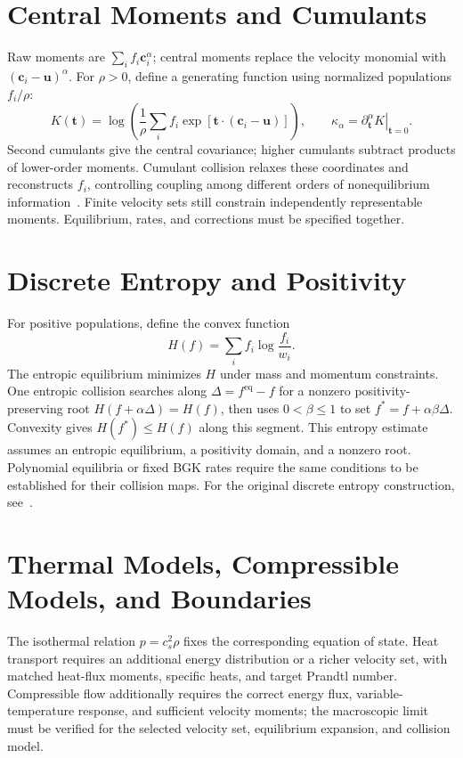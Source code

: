 \section{Central Moments and Cumulants}
Raw moments are $\sum_i f_i\bm c_i^\alpha$; central moments replace the velocity monomial with
$(\bm c_i-\bm u)^\alpha$.
For $\rho>0$, define a generating function using normalized populations $f_i/\rho$:
\[
K(\bm t)=\log\left(\frac1\rho\sum_i f_i
\exp[\bm t\cdot(\bm c_i-\bm u)]\right),\qquad
\kappa_\alpha=\left.\partial_{\bm t}^{\alpha}K\right|_{\bm t=0}.
\]
Second cumulants give the central covariance; higher cumulants subtract products of lower-order moments.
Cumulant collision relaxes these coordinates and reconstructs $f_i$,
controlling coupling among different orders of nonequilibrium information~\cite{geier2015}.
Finite velocity sets still constrain independently representable moments. Equilibrium, rates, and corrections must be specified together.

\section{Discrete Entropy and Positivity}
For positive populations, define the convex function
\[
H(f)=\sum_i f_i\log\frac{f_i}{w_i}.
\]
The entropic equilibrium minimizes $H$ under mass and momentum constraints.
One entropic collision searches along $\Delta=f^{\mathrm{eq}}-f$ for a nonzero positivity-preserving root
$H(f+\alpha\Delta)=H(f)$, then uses $0<\beta\le1$ to set
$f^*=f+\alpha\beta\Delta$.
Convexity gives $H(f^*)\le H(f)$ along this segment.
This entropy estimate assumes an entropic equilibrium, a positivity domain, and a nonzero root. Polynomial equilibria or fixed BGK rates require the same conditions to be established for their collision maps.
For the original discrete entropy construction, see~\cite{karlin1999}.

\section{Thermal Models, Compressible Models, and Boundaries}
The isothermal relation $p=c_s^2\rho$ fixes the corresponding equation of state.
Heat transport requires an additional energy distribution or a richer velocity set,
with matched heat-flux moments, specific heats, and target Prandtl number.
Compressible flow additionally requires the correct energy flux, variable-temperature response, and sufficient velocity moments;
the macroscopic limit must be verified for the selected velocity set, equilibrium expansion, and collision model.

